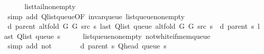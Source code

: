 \begin{isabellebody}
\ \ \ \ \isamarkupfalse%
\ list{\isacharunderscore}{\kern0pt}tail{\isacharunderscore}{\kern0pt}non{\isacharunderscore}{\kern0pt}empty\isanewline
\ \ \ \ \isamarkupfalse%
\ {\isacharparenleft}{\kern0pt}simp\ add{\isacharcolon}{\kern0pt}\ Q{\isachardot}{\kern0pt}list{\isacharunderscore}{\kern0pt}queue{\isacharbrackleft}{\kern0pt}OF\ invar{\isacharunderscore}{\kern0pt}queue\ list{\isacharunderscore}{\kern0pt}queue{\isacharunderscore}{\kern0pt}non{\isacharunderscore}{\kern0pt}empty{\isacharbrackright}{\kern0pt}{\isacharparenright}{\kern0pt}\isanewline
\ \ \isamarkupfalse%
\ {\isachardoublequoteopen}d\ {\isacharparenleft}{\kern0pt}parent\ {\isacharparenleft}{\kern0pt}alt{\isacharunderscore}{\kern0pt}fold\ G{}\ G{}\ src\ s{\isacharparenright}{\kern0pt}{\isacharparenright}{\kern0pt}\ {\isacharparenleft}{\kern0pt}last\ {\isacharparenleft}{\kern0pt}Q{\isacharunderscore}{\kern0pt}list\ {\isacharparenleft}{\kern0pt}queue\ {\isacharparenleft}{\kern0pt}alt{\isacharunderscore}{\kern0pt}fold\ G{}\ G{}\ src\ s{\isacharparenright}{\kern0pt}{\isacharparenright}{\kern0pt}{\isacharparenright}{\kern0pt}{\isacharparenright}{\kern0pt}\ {\isacharequal}{\kern0pt}\ d\ {\isacharparenleft}{\kern0pt}parent\ s{\isacharparenright}{\kern0pt}\ {\isacharparenleft}{\kern0pt}last\ {\isacharparenleft}{\kern0pt}Q{\isacharunderscore}{\kern0pt}list\ {\isacharparenleft}{\kern0pt}queue\ s{\isacharparenright}{\kern0pt}{\isacharparenright}{\kern0pt}{\isacharparenright}{\kern0pt}{\isachardoublequoteclose}\isanewline
\ \ \ \ \isamarkupfalse%
\ list{\isacharunderscore}{\kern0pt}queue{\isacharunderscore}{\kern0pt}non{\isacharunderscore}{\kern0pt}empty\ not{\isacharunderscore}{\kern0pt}white{\isacharunderscore}{\kern0pt}if{\isacharunderscore}{\kern0pt}mem{\isacharunderscore}{\kern0pt}queue\isanewline
\ \ \ \ \isamarkupfalse%
\ {\isacharparenleft}{\kern0pt}simp\ add{\isacharcolon}{\kern0pt}\ not{\isacharunderscore}{\kern0pt}{\isacharparenleft}{\kern0pt}{}{\isacharparenright}{\kern0pt}{\isacharparenright}{\kern0pt}\isanewline
\ \ \isamarkupfalse%
\ \isamarkupfalse%
\ {\isachardoublequoteopen}{\isachardot}{\kern0pt}{\isachardot}{\kern0pt}{\isachardot}{\kern0pt}\ {\isasymle}\ d\ {\isacharparenleft}{\kern0pt}parent\ s{\isacharparenright}{\kern0pt}\ {\isacharparenleft}{\kern0pt}Q{\isacharunderscore}{\kern0pt}head\ {\isacharparenleft}{\kern0pt}queue\ s{\isacharparenright}{\kern0pt}{\isacharparenright}{\kern0pt}\ {\isacharplus}{\kern0pt}\ {}{\isachardoublequoteclose}\isanewline

\end{isabellebody}
